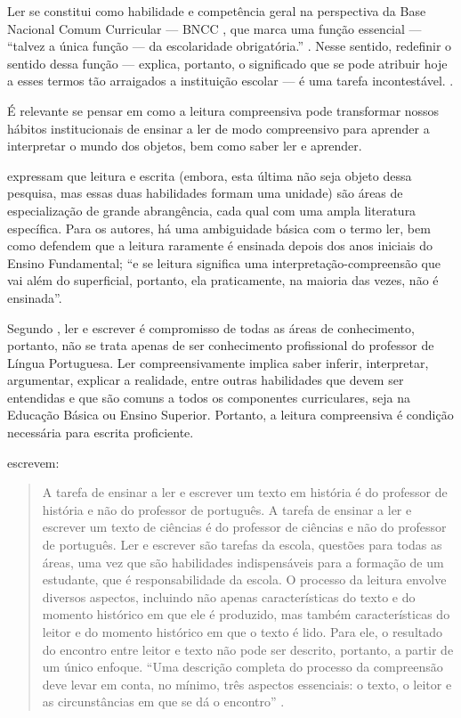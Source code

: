 \begin{refsection}
    Ler se constitui como habilidade e competência geral na perspectiva da Base Nacional Comum Curricular --- BNCC \cite{BaNacCurEF2017}, que marca uma função essencial --- “talvez a única função --- da escolaridade obrigatória.” \cite[p.~17]{Lenner2002Ler}. Nesse sentido, redefinir o sentido dessa função --- explica, portanto, o significado que se pode atribuir hoje a esses termos tão arraigados a instituição escolar --- é uma tarefa incontestável. \cite[p.~17]{Lenner2002Ler}.

    É relevante se pensar em como a leitura compreensiva pode transformar nossos hábitos institucionais de ensinar a ler de modo compreensivo para aprender a interpretar o mundo dos objetos, bem como saber ler e aprender.

    \textcite{BagnoEtAl2002Lingua} expressam que leitura e escrita (embora, esta última não seja objeto dessa pesquisa, mas essas duas habilidades formam uma unidade) são áreas de especialização de grande abrangência, cada qual com uma ampla literatura específica. Para os autores, há uma ambiguidade básica com o termo ler, bem como defendem que a leitura raramente é ensinada depois dos anos iniciais do Ensino Fundamental; “e se leitura significa uma interpretação-compreensão que vai além do superficial, portanto, ela praticamente, na maioria das vezes, não é ensinada”. \cite[p.~128]{BagnoEtAl2002Lingua} 

    Segundo \textcite[p.~11]{NevesEtAl2003Ler}, ler e escrever é compromisso de todas as áreas de conhecimento, portanto, não se trata apenas de ser conhecimento profissional do professor de Língua Portuguesa. Ler compreensivamente implica saber inferir, interpretar, argumentar, explicar a realidade, entre outras habilidades que devem ser entendidas e que são comuns a todos os componentes curriculares, seja na Educação Básica ou Ensino Superior. Portanto, a leitura compreensiva é condição necessária para escrita proficiente. 

    \textcite{GuedesAndSouza2011NaoApenas} escrevem:

    \begin{quotation}
        A tarefa de ensinar a ler e escrever um texto em história é do professor de história e não do professor de português. A tarefa de ensinar a ler e escrever um texto de ciências é do professor de ciências e não do professor de português. Ler e escrever são tarefas da escola, questões para todas as áreas, uma vez que são habilidades indispensáveis para a formação de um estudante, que é responsabilidade da escola. O processo da leitura envolve diversos aspectos, incluindo não apenas características do texto e do momento histórico em que ele é produzido, mas também características do leitor e do momento histórico em que o texto é lido.  Para ele, o resultado do encontro entre leitor e texto não pode ser descrito, portanto, a partir de um único enfoque. “Uma descrição completa do processo da compreensão deve levar em conta, no mínimo, três aspectos essenciais: o texto, o leitor e as circunstâncias em que se dá o encontro” \cite[p.~1]{GuedesAndSouza2011NaoApenas}.
    \end{quotation}



\end{refsection}
